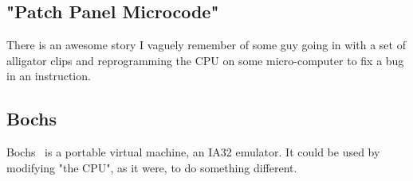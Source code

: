 \documentclass[12pt]{article}
\begin{document}
\subsection{"Patch Panel Microcode"}

There is an awesome story I vaguely remember of some guy going in with a set of alligator clips and reprogramming the CPU on some micro-computer to fix a bug in an instruction.

\subsection{Bochs}

Bochs~\cite{bochs} is a portable virtual machine, an IA32 emulator. It could be used by modifying "the CPU", as it were, to do something different.



\end{document}
